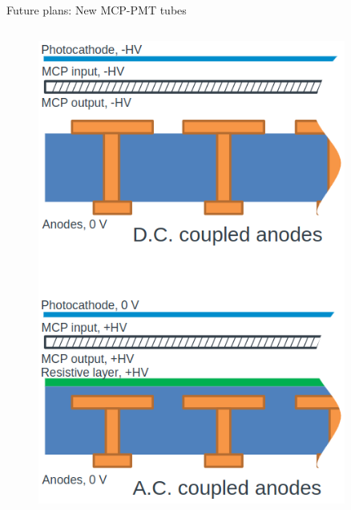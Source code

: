 \documentclass[xcolor={dvipsnames}]{beamer}
\begin{document}
\begin{frame}{Future plans: New MCP-PMT tubes}
\begin{columns}
\begin{column}{0.42\textwidth}
\begin{figure}
        \includegraphics[width = 0.9\textwidth]{Figs/ACvsDCCoupledAnode.png}
      \end{figure}
    \end{column}
  \end{columns}
\end{frame}
\end{document}
